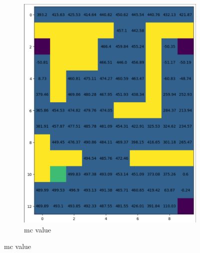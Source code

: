 \documentclass{article}
\begin{document}
\begin{figure}[h]
\begin{subfigure} {0.5\textwidth}
            \includegraphics[width=0.9\linewidth]{images/mc_value}
            \caption{mc value}\label{fig:mc_value}
        \end{subfigure}
    \end{figure}
\end{document}

